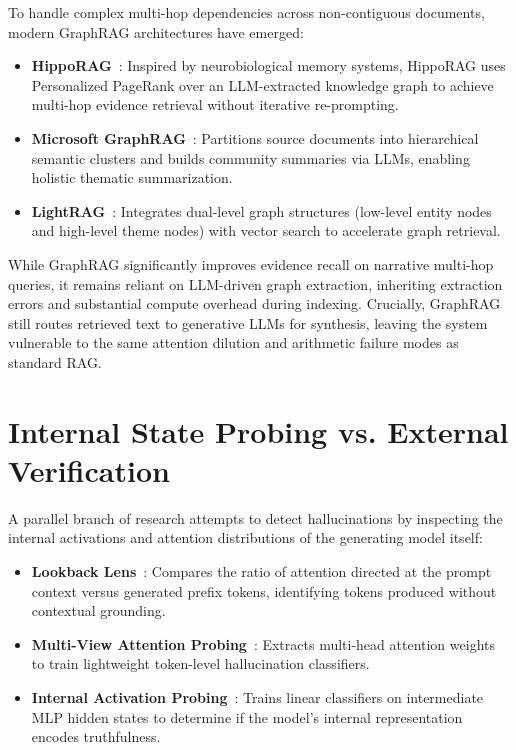 To handle complex multi-hop dependencies across non-contiguous documents, modern GraphRAG architectures have emerged:
\begin{itemize}
    \item \textbf{HippoRAG}~\cite{gutierrez2024hipporag}: Inspired by neurobiological memory systems, HippoRAG uses Personalized PageRank over an LLM-extracted knowledge graph to achieve multi-hop evidence retrieval without iterative re-prompting.
    \item \textbf{Microsoft GraphRAG}~\cite{edge2024graphrag}: Partitions source documents into hierarchical semantic clusters and builds community summaries via LLMs, enabling holistic thematic summarization.
    \item \textbf{LightRAG}~\cite{guo2024lightrag}: Integrates dual-level graph structures (low-level entity nodes and high-level theme nodes) with vector search to accelerate graph retrieval.
\end{itemize}

While GraphRAG significantly improves evidence recall on narrative multi-hop queries, it remains reliant on LLM-driven graph extraction, inheriting extraction errors and substantial compute overhead during indexing. Crucially, GraphRAG still routes retrieved text to generative LLMs for synthesis, leaving the system vulnerable to the same attention dilution and arithmetic failure modes as standard RAG.

\section{Internal State Probing vs. External Verification}
\label{sec:internal_vs_external}

A parallel branch of research attempts to detect hallucinations by inspecting the internal activations and attention distributions of the generating model itself:
\begin{itemize}
    \item \textbf{Lookback Lens}~\cite{chuang2024lookback}: Compares the ratio of attention directed at the prompt context versus generated prefix tokens, identifying tokens produced without contextual grounding.
    \item \textbf{Multi-View Attention Probing}~\cite{ogasa2025multiview}: Extracts multi-head attention weights to train lightweight token-level hallucination classifiers.
    \item \textbf{Internal Activation Probing}~\cite{azaria2023internal}: Trains linear classifiers on intermediate MLP hidden states to determine if the model's internal representation encodes truthfulness.
\end{itemize}

